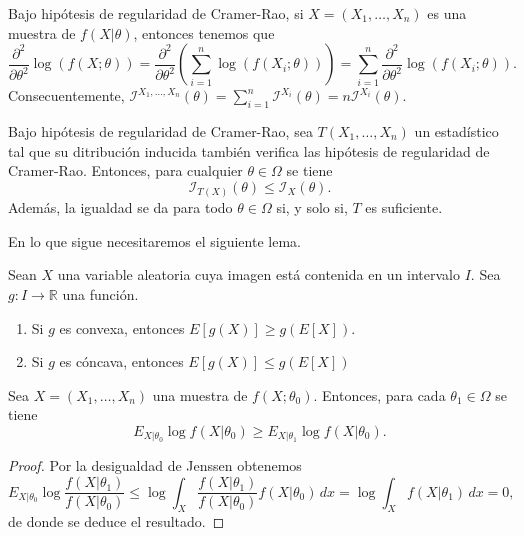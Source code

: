 \documentclass{article}
\begin{document}
    \begin{remark}
        Bajo hipótesis de regularidad de Cramer-Rao, si $X=(X_1, \ldots, X_n)$ es una muestra de $f(X|\theta)$, entonces tenemos que
        \[\frac{\partial^2}{\partial \theta^2}\log(f(X;\theta)) = \frac{\partial^2}{\partial \theta^2} \left(\sum_{i = 1}^n \log(f(X_i;\theta))\right) = \sum_{i = 1}^n \frac{\partial^2}{\partial \theta^2}\log(f(X_i;\theta)).\]
        Consecuentemente, $\mathcal{I}^{X_1, \ldots, X_n}(\theta) = \sum_{i = 1}^n \mathcal{I}^{X_i}(\theta) = n \mathcal{I}^{X_i}(\theta)$.
    \end{remark}

    \begin{lem}
        Bajo hipótesis de regularidad de Cramer-Rao, sea $T(X_1, \ldots, X_n)$ un estadístico tal que su ditribución inducida también verifica las hipótesis de regularidad de Cramer-Rao. Entonces, para cualquier $\theta \in \Omega$ se tiene
        \[\mathcal{I}_{T(X)}(\theta) \le \mathcal{I}_{X}(\theta).\]
        Además, la igualdad se da para todo $\theta \in \Omega$ si, y solo si, $T$ es suficiente.
    \end{lem}

    En lo que sigue necesitaremos el siguiente lema.

    \begin{lem}
        Sean $X$ una variable aleatoria cuya imagen está contenida en un intervalo $I$. Sea $g: I \to \mathbb{R}$ una función.
        \begin{enumerate}
            \item Si $g$ es convexa, entonces $E[g(X)] \ge g(E[X])$.
            \item Si $g$ es cóncava, entonces $E[g(X)] \le g(E[X])$
        \end{enumerate}
    \end{lem}

    \begin{prop} \label{prop:desigualdad}
        Sea $X = (X_1, \ldots, X_n)$ una muestra de $f(X;\theta_0)$. Entonces, para cada $\theta_1 \in \Omega$ se tiene
        \[E_{X|\theta_0} \log f(X|\theta_0) \ge E_{X|\theta_1} \log f(X|\theta_0).\]
    \end{prop}
    \begin{proof}
        Por la desigualdad de Jenssen obtenemos
        \[E_{X|\theta_0} \log \frac{f(X|\theta_1)}{f(X|\theta_0)} \le \log \int_X \frac{f(X|\theta_1)}{f(X|\theta_0)} f(X|\theta_0) \, dx = \log \int_X f(X|\theta_1) \, dx = 0,\]
        de donde se deduce el resultado.
    \end{proof}
\end{document}
